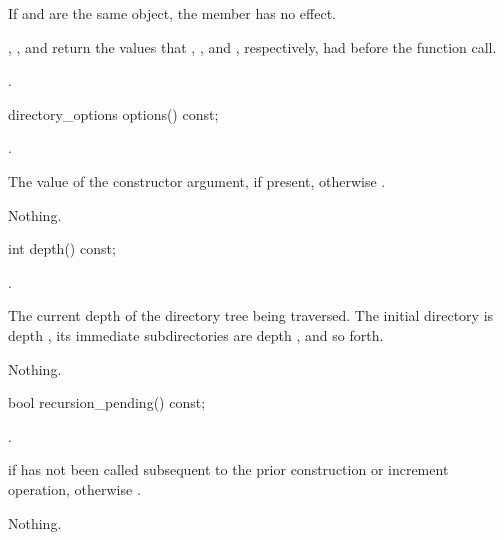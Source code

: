 \begin{itemdescr}
\pnum
\effects If  and  are the same
object, the member has no effect.

\pnum
\postconditions {}, ,
and  return the values that ,
, and , respectively, had before the function call.

\pnum
\returns {}.
\end{itemdescr}

\begin{itemdecl}
directory_options options() const;
\end{itemdecl}

\begin{itemdescr}
\pnum
\requires {}.

\pnum
\returns The value of the constructor  argument,
if present, otherwise .

\pnum
\throws Nothing.
\end{itemdescr}

\begin{itemdecl}
int depth() const;
\end{itemdecl}

\begin{itemdescr}
\pnum
\requires {}.

\pnum
\returns The current depth of the directory tree being traversed. \enternote
  The initial directory is depth , its immediate subdirectories are depth ,
  and so forth. \exitnote

\pnum
\throws Nothing.
\end{itemdescr}

\begin{itemdecl}
bool recursion_pending() const;
\end{itemdecl}

\begin{itemdescr}
\pnum
\requires {}.

\pnum
\returns {} if 
  has not been called subsequent to the prior construction or increment
  operation, otherwise .

\pnum
\throws Nothing.
\end{itemdescr}

